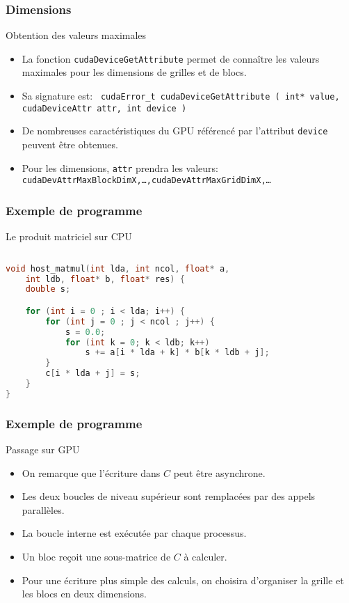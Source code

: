 \begin{frame}
    \frametitle{Dimensions}
\begin{block}{Obtention des valeurs maximales}
    \begin{itemize}
          \item<+-> La fonction \texttt{cudaDeviceGetAttribute} permet de connaître les valeurs maximales pour les dimensions de grilles
          et de blocs.
          \item<+-> Sa signature est:
        {\footnotesize \nvhost \nvdevice \texttt{ cudaError\_t cudaDeviceGetAttribute ( int* value, cudaDeviceAttr attr, int  device )}}
          \item<+-> De nombreuses caractéristiques du GPU référencé par l'attribut \texttt{device} peuvent être obtenues.
          \item<+-> Pour les dimensions,  \texttt{attr} prendra les valeurs: 
          {\footnotesize \texttt{cudaDevAttrMaxBlockDimX,\dots,cudaDevAttrMaxGridDimX,\dots }}
    \end{itemize}
\end{block}
\end{frame}
\begin{frame}[fragile]
    \frametitle{Exemple de programme}
\begin{block}{Le produit matriciel sur CPU}
    \begin{lstlisting}[basicstyle=\footnotesize,tabsize=4,language=c++]
  
void host_matmul(int lda, int ncol, float* a, 
    int ldb, float* b, float* res) {
	double s;

	for (int i = 0 ; i < lda; i++) {
		for (int j = 0 ; j < ncol ; j++) {
			s = 0.0;
			for (int k = 0; k < ldb; k++)
				s += a[i * lda + k] * b[k * ldb + j];
		}
		c[i * lda + j] = s;
	}
}
\end{lstlisting}
\end{block}
\end{frame}

\begin{frame}
    \frametitle{Exemple de programme}
\begin{block}{Passage sur GPU}
    \begin{itemize}
        \item<+-> On remarque que l'écriture dans $C$ peut être asynchrone.
        \item<+-> Les deux boucles de niveau supérieur sont remplacées par des appels parallèles.
        \item<+-> La boucle interne est exécutée par chaque processus.
        \item<+-> Un bloc reçoit une sous-matrice de $C$ à calculer.
        \item<+-> Pour une écriture plus simple des calculs, on choisira d'organiser la grille et les 
        blocs en deux dimensions.
    \end{itemize}
\end{block}
\end{frame}

